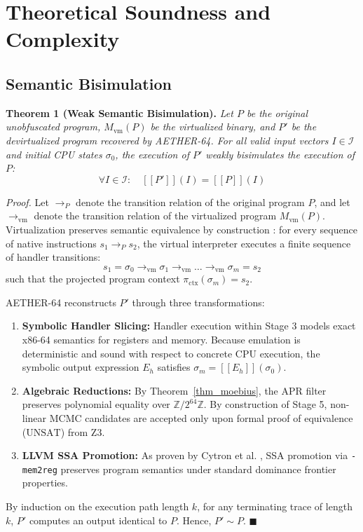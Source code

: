\documentclass[11pt,a4paper]{article}
\begin{document}
\section{Theoretical Soundness and Complexity}
\label{sec_theory}

\subsection{Semantic Bisimulation}

\textbf{Theorem 1 (Weak Semantic Bisimulation).}
\textit{Let $P$ be the original unobfuscated program, $M_{\text{vm}}(P)$ be the virtualized binary, and $P'$ be the devirtualized program recovered by AETHER-64. For all valid input vectors $I \in \mathcal{I}$ and initial CPU states $\sigma_0$, the execution of $P'$ weakly bisimulates the execution of $P$:}
\begin{equation}
\forall I \in \mathcal{I}: \quad [\![ P' ]\!](I) = [\![ P ]\!](I)
\end{equation}

\textit{Proof.} 
Let $\rightarrow_P$ denote the transition relation of the original program $P$, and let $\rightarrow_{\text{vm}}$ denote the transition relation of the virtualized program $M_{\text{vm}}(P)$. Virtualization preserves semantic equivalence by construction \cite{collberg2002}: for every sequence of native instructions $s_1 \rightarrow_P s_2$, the virtual interpreter executes a finite sequence of handler transitions:
\begin{equation}
s_1 = \sigma_0 \rightarrow_{\text{vm}} \sigma_1 \rightarrow_{\text{vm}} \dots \rightarrow_{\text{vm}} \sigma_m = s_2
\end{equation}
such that the projected program context $\pi_{\text{ctx}}(\sigma_m) = s_2$.

AETHER-64 reconstructs $P'$ through three transformations:
\begin{enumerate}
    \item \textbf{Symbolic Handler Slicing:} Handler execution within Stage 3 models exact x86-64 semantics for registers and memory. Because emulation is deterministic and sound with respect to concrete CPU execution, the symbolic output expression $E_h$ satisfies $\sigma_m = [\![ E_h ]\!](\sigma_0)$.
    \item \textbf{Algebraic Reductions:} By Theorem~\ref{thm_moebius}, the APR filter preserves polynomial equality over $\mathbb{Z}/2^{64}\mathbb{Z}$. By construction of Stage 5, non-linear MCMC candidates are accepted only upon formal proof of equivalence ($\text{UNSAT}$) from Z3.
    \item \textbf{LLVM SSA Promotion:} As proven by Cytron et al. \cite{cytron1991}, SSA promotion via \texttt{-mem2reg} preserves program semantics under standard dominance frontier properties.
\end{enumerate}
By induction on the execution path length $k$, for any terminating trace of length $k$, $P'$ computes an output identical to $P$. Hence, $P' \sim P$. \hfill $\blacksquare$
\end{document}
